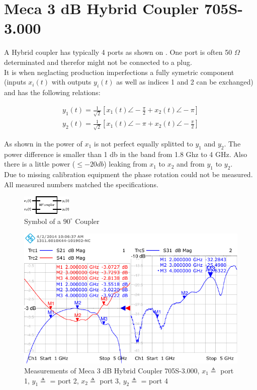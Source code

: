 \section{Meca 3 dB Hybrid Coupler 705S-3.000}
\label{sec:comp_90deg}

A Hybrid coupler has typically 4 ports as shown on
.
One port is often 50 $\Omega$ determinated and therefor might not be connected
to a plug. \\

It is when neglacting production imperfections a fully symetric component
(inputs $x_i(t)$ with outputs $y_i(t)$ as well as indices 1 and 2
can be exchanged) and has the following relations:

\begin{align}
y_1(t) = \frac{1}{\sqrt{2}} \left[x_1(t) \angle -\frac{\pi}{2} + x_2(t) \angle -\pi \right] \\
y_2(t) = \frac{1}{\sqrt{2}} \left[x_1(t) \angle -\pi + x_2(t) \angle -\frac{\pi}{2} \right] 
\end{align}

As shown in  the power of
$x_1$ is not perfect equally splitted to $y_1$ and $y_2$. The power difference
is smaller than 1 db in the band from 1.8 Ghz to 4 GHz.
Also there is a little power ($\leq -20 db$) leaking from $x_1$ to $x_2$ and from
$y_1$ to $y_2$. \\

Due to missing calibration equipment the phase rotation could not be measured.
All measured numbers matched the specifications.

\begin{figure}
  \centering
  \includegraphics{figures/90deg_coupler_symbol}
  \caption{Symbol of a $90^\circ$ Coupler}
  \label{fig:90deg_coupler_symbol}
\end{figure}

\begin{figure}
  \centering
  \includegraphics[width=\textwidth]{figures/Meca_705S-3_coupler_id1}
  \caption{Measurements of Meca 3 dB Hybrid Coupler 705S-3.000,
    $x_1 \triangleq $ port 1, $y_1 \triangleq $ = port 2,
    $x_2 \triangleq $ port 3, $y_2 \triangleq $ = port 4}
  \label{fig:90deg_coupler_measurement}
\end{figure}

